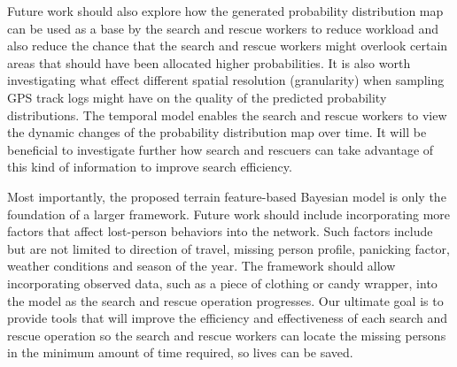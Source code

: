 Future work should also explore how the generated probability distribution map can be used as a base by the search and rescue workers to reduce workload and also reduce the chance that the search and rescue workers might overlook certain areas that should have been allocated higher probabilities. It is also worth investigating what effect different spatial resolution (granularity) when sampling GPS track logs might have on the quality of the predicted probability distributions. The temporal model enables the search and rescue workers to view the dynamic changes of the probability distribution map over time. It will be beneficial to investigate further how search and rescuers can take advantage of this kind of information to improve search efficiency.

Most importantly, the proposed terrain feature-based Bayesian model is only the foundation of a larger framework. Future work should include incorporating more factors that affect lost-person behaviors into the network. Such factors include but are not limited to direction of travel, missing person profile, panicking factor, weather conditions and season of the year. The framework should allow incorporating observed data, such as a piece of clothing or candy wrapper, into the model as the search and rescue operation progresses. Our ultimate goal is to provide tools that will improve the efficiency and effectiveness of each search and rescue operation so the search and rescue workers can locate the missing persons in the minimum amount of time required, so lives can be saved.
